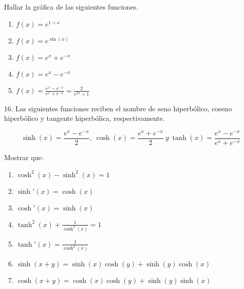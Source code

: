 \documentclass[12pt]{article}
\begin{document}
Hallar la gr\'afica de las siguientes funciones.

\begin{enumerate}[\hspace{9px} a)]
    \item \(f(x)=e^{1+x}\)

    \item \(f(x)=e^{\sin(x)}\)

    \item \(f(x)=e^x+e^{-x}\)

    \item \(f(x)=e^x-e^{-x}\)

    \item \(f(x)=\displaystyle\frac{e^x-e^{-x}}{e^x+e^{-x}}=\frac{2}{e^{2x}+1}\)

\end{enumerate}

16. Las siguientes funciones reciben el nombre de seno hiperb\'olico, coseno hiperb\'olico y tangente hiperb\'olica, respectivamente.

\begin{equation*}
    \sinh(x)=\frac{e^x-e^{-x}}{2}, \ \cosh(x)=\frac{e^x+e^{-x}}{2} \ y \ \tanh(x)=\frac{e^x-e^{-x}}{e^x+e^{-x}}
\end{equation*}

Mostrar que:

\begin{enumerate}[\hspace{9px} a)]
    \item \(\cosh^2(x)-\sinh^2(x)=1\)

    \item \(\sinh'(x)=\cosh(x)\)

    \item \(\cosh'(x)=\sinh(x)\)

    \item \(\tanh^2(x)+\displaystyle\frac{1}{\cosh^2(x)}=1\)

    \item \(\tanh'(x)=\displaystyle\frac{1}{\cosh^2(x)}\)

    \item \(\sinh(x+y)=\sinh(x)\cosh(y)+\sinh(y)\cosh(x)\)

    \item \(\cosh(x+y)=\cosh(x)\cosh(y)+\sinh(y)\sinh(x)\)

\end{enumerate}
\end{document}
